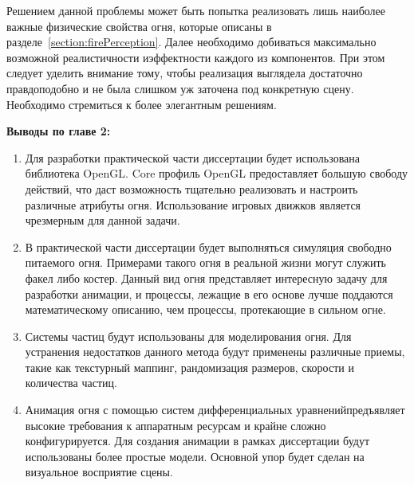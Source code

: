 Решением данной проблемы может быть попытка реализовать лишь наиболее важные
физические свойства огня, которые описаны в
разделе~\ref{section:firePerception}. Далее необходимо добиваться максимально
возможной реалистичности и\break{}эффектности каждого из компонентов. При этом
следует уделить внимание тому, чтобы реализация выглядела достаточно
правдоподобно и не была слишком уж заточена под конкретную сцену. Необходимо
стремиться к более элегантным решениям.

\textbf{Выводы по главе 2:}
\begin{enumerate}
    \item Для разработки практической части диссертации будет использована
        библиотека OpenGL\@. Core профиль OpenGL предоставляет большую
        свободу действий, что даст возможность тщательно реализовать и настроить
        различные атрибуты огня. Использование игровых движков является
        чрезмерным для данной задачи.
    \item В практической части диссертации будет выполняться симуляция свободно
        питаемого огня. Примерами такого огня в реальной жизни могут служить
        факел либо костер. Данный вид огня представляет интересную задачу для
        разработки анимации, и процессы, лежащие в его основе лучше поддаются
        математическому описанию, чем процессы, протекающие в сильном огне.
    \item Системы частиц будут использованы для моделирования огня. Для
        устранения недостатков данного метода будут применены различные приемы,
        такие как текстурный маппинг, рандомизация размеров, скорости и
        количества частиц.
    \item Анимация огня с помощью систем дифференциальных
        уравнений\break{}предъявляет высокие требования к аппаратным ресурсам и
        крайне сложно конфигурируется. Для создания анимации в рамках
        диссертации будут использованы более простые модели. Основной упор будет
        сделан на визуальное восприятие сцены.
\end{enumerate}
